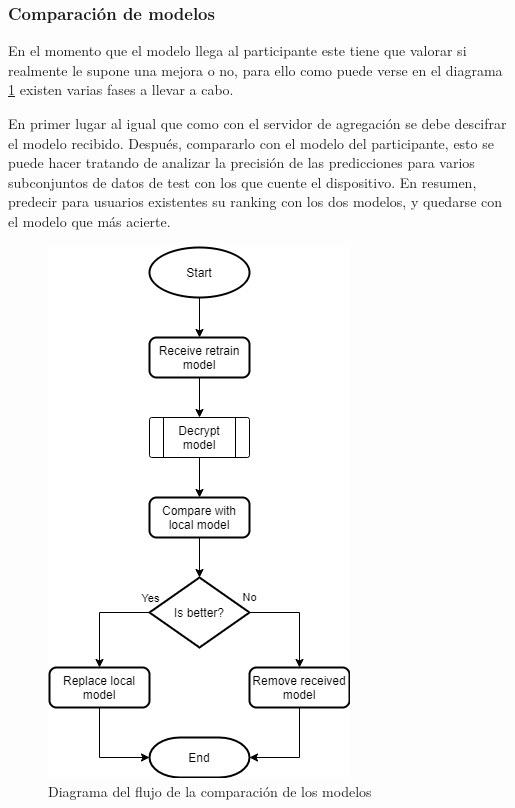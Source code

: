 \subsubsection{Comparación de modelos}
En el momento que el modelo llega al participante este tiene que valorar si realmente le supone una mejora o no, para ello como puede verse en el diagrama \ref{fig:Flow_Compare} existen varias fases a llevar a cabo.

En primer lugar al igual que como con el servidor de agregación se debe descifrar el modelo recibido. Después, compararlo con el modelo del participante, esto se puede hacer tratando de analizar la precisión de las predicciones para varios subconjuntos de datos de test con los que cuente el dispositivo. En resumen, predecir para usuarios existentes su ranking con los dos modelos, y quedarse con el modelo que más acierte.

\begin{figure}[H]
    \centering
    \includegraphics[height=0.6\textheight]{Figuras/flowchart_compare.png}    
    \caption{Diagrama del flujo de la comparación de los modelos} 
    \label{fig:Flow_Compare}
\end{figure}
